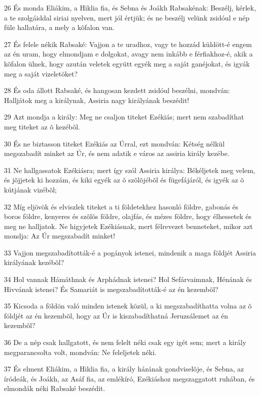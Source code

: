 \par 26 És monda Eliákim, a Hiklia fia, és Sebna és Joákh Rabsakénak: Beszélj, kérlek, a te szolgáiddal siriai nyelven, mert jól értjük; és ne beszélj velünk zsidóul e nép füle hallatára, a mely a kõfalon van.
\par 27 És felele nékik Rabsaké: Vajjon a te uradhoz, vagy te hozzád küldött-é engem az én uram, hogy elmondjam e dolgokat, avagy nem inkább e férfiakhoz-é, akik a kõfalon ülnek, hogy azután veletek együtt egyék meg a saját ganéjokat, és igyák meg a saját vizeletöket?
\par 28 És oda állott Rabsaké, és hangosan kezdett zsidóul beszélni, mondván: Halljátok meg a királynak, Assiria nagy királyának beszédit!
\par 29 Azt mondja a király: Meg ne csaljon titeket Ezékiás; mert nem szabadíthat meg titeket az õ kezébõl.
\par 30 És ne biztasson titeket Ezékiás az Úrral, ezt mondván: Kétség nélkül megszabadít minket az Úr, és nem adatik e város az assiria király kezébe.
\par 31 Ne hallgassatok Ezékiásra; mert így szól Assiria királya: Békéljetek meg velem, és jõjjetek ki hozzám, és kiki egyék az õ szõlõjébõl és fügefájáról, és igyék az õ kútjának vizébõl;
\par 32 Míg eljövök és elviszlek titeket a ti földetekhez hasonló földre, gabonás és boros földre, kenyeres és szõlõs földre, olajfás, és mézes földre, hogy élhessetek és meg ne halljatok. Ne higyjetek Ezékiásnak, mert félrevezet benneteket, mikor azt mondja: Az Úr megszabadít minket!
\par 33 Vajjon megszabadították-é a pogányok istenei, mindenik a maga földjét Assiria királyának kezébõl?
\par 34 Hol vannak Hámáthnak és Arphádnak istenei? Hol Sefárvaimnak, Hénának és Hivvának istenei? És Samariát is megszabadították-é az én kezembõl?
\par 35 Kicsoda a földön való minden istenek közül, a ki megszabadíthatta volna az õ földjét az én kezembõl, hogy az Úr is kiszabadíthatná Jeruzsálemet az én kezembõl?
\par 36 De a nép csak hallgatott, és nem felelt néki csak egy igét sem; mert a király megparancsolta volt, mondván: Ne feleljetek néki.
\par 37 És elment Eliákim, a Hiklia fia, a király házának gondviselõje, és Sebna, az íródeák, és Joákh, az Asáf fia, az emlékíró, Ezékiáshoz megszaggatott ruhában, és elmondák néki Rabsaké beszédit.

